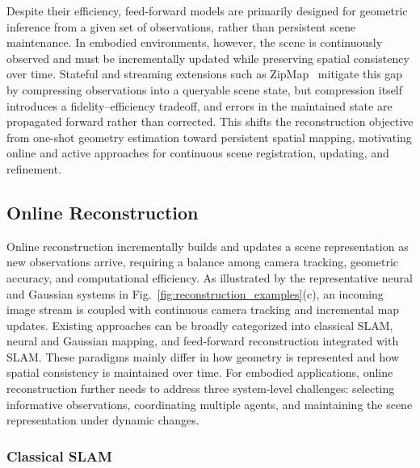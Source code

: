 \documentclass{SCIS2026}
\begin{document}
Despite their efficiency, feed-forward models are primarily designed for geometric inference from a given set of observations, rather than persistent scene maintenance. In embodied environments, however, the scene is continuously observed and must be incrementally updated while preserving spatial consistency over time. Stateful and streaming extensions such as ZipMap~\cite{jin2026zipmap} mitigate this gap by compressing observations into a queryable scene state, but compression itself introduces a fidelity--efficiency tradeoff, and errors in the maintained state are propagated forward rather than corrected. This shifts the reconstruction objective from one-shot geometry estimation toward persistent spatial mapping, motivating online and active approaches for continuous scene registration, updating, and refinement.

\subsection{Online Reconstruction}

Online reconstruction incrementally builds and updates a scene representation as new observations arrive, requiring a balance among camera tracking, geometric accuracy, and computational efficiency. As illustrated by the representative neural and Gaussian systems in Fig.~\ref{fig:reconstruction_examples}(c), an incoming image stream is coupled with continuous camera tracking and incremental map updates. Existing approaches can be broadly categorized into classical SLAM, neural and Gaussian mapping, and feed-forward reconstruction integrated with SLAM. These paradigms mainly differ in how geometry is represented and how spatial consistency is maintained over time. For embodied applications, online reconstruction further needs to address three system-level challenges: selecting informative observations, coordinating multiple agents, and maintaining the scene representation under dynamic changes.

\subsubsection{Classical SLAM}
\end{document}
